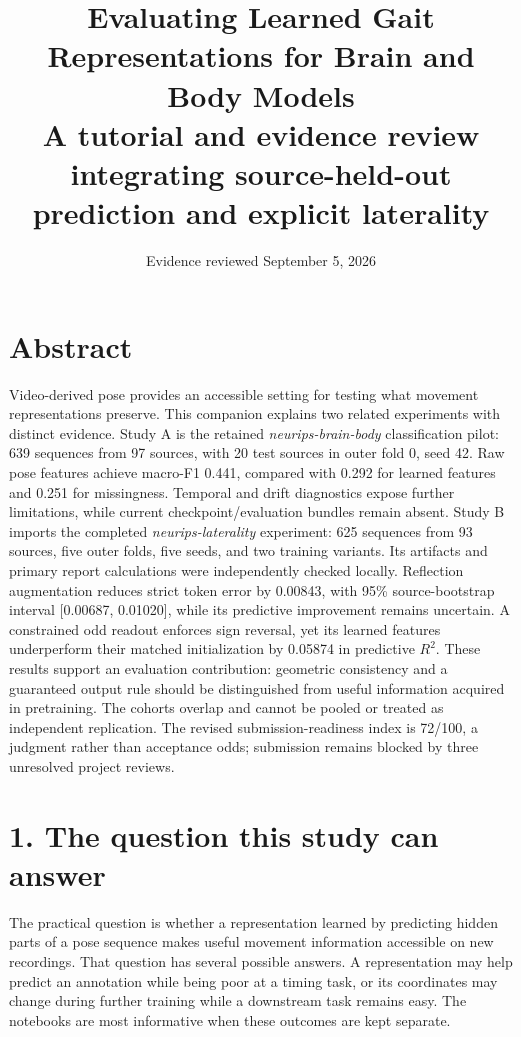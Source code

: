 \documentclass[11pt,letterpaper]{article}
\title{\LARGE Evaluating Learned Gait Representations for Brain and Body
Models\\[0.45em]\large A tutorial and evidence review integrating
source-held-out prediction and explicit laterality}
\author{}
\date{\small Evidence reviewed September 5, 2026}
\begin{document}
\maketitle
\section{Abstract}\label{abstract}

Video-derived pose provides an accessible setting for testing what
movement representations preserve. This companion explains two related
experiments with distinct evidence. Study A is the retained
\emph{neurips-brain-body} classification pilot: 639 sequences from 97
sources, with 20 test sources in outer fold 0, seed 42. Raw pose
features achieve macro-F1 0.441, compared with 0.292 for learned
features and 0.251 for missingness. Temporal and drift diagnostics
expose further limitations, while current checkpoint/evaluation bundles
remain absent. Study B imports the completed \emph{neurips-laterality}
experiment: 625 sequences from 93 sources, five outer folds, five seeds,
and two training variants. Its artifacts and primary report calculations
were independently checked locally. Reflection augmentation reduces
strict token error by 0.00843, with 95\% source-bootstrap interval
{[}0.00687, 0.01020{]}, while its predictive improvement remains
uncertain. A constrained odd readout enforces sign reversal, yet its
learned features underperform their matched initialization by 0.05874 in
predictive \(R^2\). These results support an evaluation contribution:
geometric consistency and a guaranteed output rule should be
distinguished from useful information acquired in pretraining. The
cohorts overlap and cannot be pooled or treated as independent
replication. The revised submission-readiness index is 72/100, a
judgment rather than acceptance odds; submission remains blocked by
three unresolved project reviews.

\section{1. The question this study can
answer}\label{the-question-this-study-can-answer}

The practical question is whether a representation learned by predicting
hidden parts of a pose sequence makes useful movement information
accessible on new recordings. That question has several possible
answers. A representation may help predict an annotation while being
poor at a timing task, or its coordinates may change during further
training while a downstream task remains easy. The notebooks are most
informative when these outcomes are kept separate.
\end{document}

